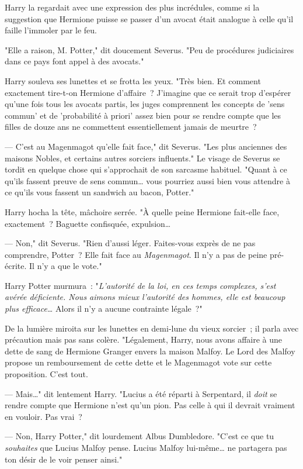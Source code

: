 Harry la regardait avec une expression des plus incrédules, comme si la suggestion que Hermione puisse se passer d'un avocat était analogue à celle qu'il faille l'immoler par le feu.

"Elle a raison, M. Potter," dit doucement Severus. "Peu de procédures judiciaires dans ce pays font appel à des avocats."

Harry souleva ses lunettes et se frotta les yeux. "Très bien. Et comment exactement tire-t-on Hermione d'affaire~? J'imagine que ce serait trop d'espérer qu'une fois tous les avocats partis, les juges comprennent les concepts de 'sens commun' et de 'probabilité à priori' assez bien pour se rendre compte que les filles de douze ans ne commettent essentiellement jamais de meurtre~?

--- C'est au Magenmagot qu'elle fait face," dit Severus. "Les plus anciennes des maisons Nobles, et certains autres sorciers influents." Le visage de Severus se tordit en quelque chose qui s'approchait de son sarcasme habituel. "Quant à ce qu'ils fassent preuve de sens commun… vous pourriez aussi bien vous attendre à ce qu'ils vous fassent un sandwich au bacon, Potter."

Harry hocha la tête, mâchoire serrée. "À quelle peine Hermione fait-elle face, exactement~? Baguette confisquée, expulsion…

--- Non," dit Severus. "Rien d'aussi léger. Faites-vous exprès de ne pas comprendre, Potter~? Elle fait face au \emph{Magenmagot}. Il n'y a pas de peine pré-écrite. Il n'y a que le vote."

Harry Potter murmura~: "\emph{L'autorité de la loi, en ces temps complexes, s'est avérée déficiente. Nous aimons mieux l'autorité des hommes, elle est beaucoup plus efficace…} Alors il n'y a aucune contrainte légale~?"

De la lumière miroita sur les lunettes en demi-lune du vieux sorcier~; il parla avec précaution mais pas sans colère. "Légalement, Harry, nous avons affaire à une dette de sang de Hermione Granger envers la maison Malfoy. Le Lord des Malfoy propose un remboursement de cette dette et le Magenmagot vote sur cette proposition. C'est tout.

--- Mais…" dit lentement Harry. "Lucius a été réparti à Serpentard, il \emph{doit} se rendre compte que Hermione n'est qu'un pion. Pas celle à qui il devrait vraiment en vouloir. Pas vrai~?

--- Non, Harry Potter," dit lourdement Albus Dumbledore. "C'est ce que tu \emph{souhaites} que Lucius Malfoy pense. Lucius Malfoy lui-même… ne partagera pas ton désir de le voir penser ainsi."

